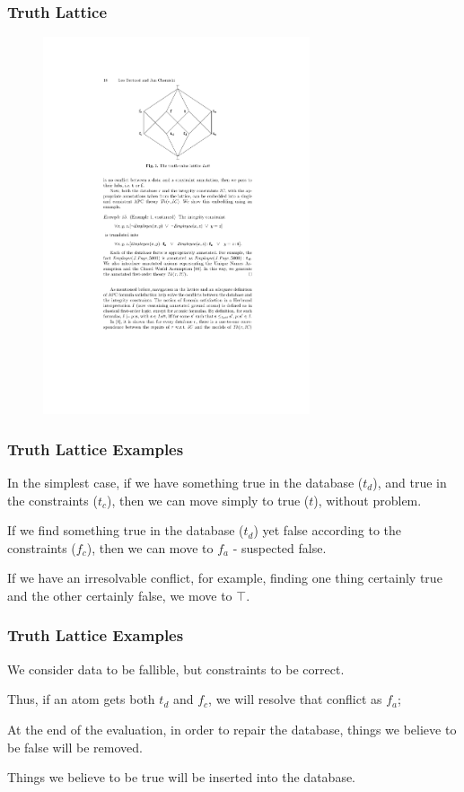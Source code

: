 \begin{frame}
\frametitle{Truth Lattice}

\begin{figure}[!h]
  \centering \includegraphics[width=0.7\textwidth]{images/TruthLattice.pdf}
\end{figure}


\end{frame}

\begin{frame}
\frametitle{Truth Lattice Examples}

In the simplest case, if we have something true in the database ($t_d$), and true in the constraints ($t_c$), then we can move simply to true ($t$), without problem. 

If we find something true in the database ($t_d$) yet false according to the constraints ($f_c$), then we can move to $f_a$ - suspected false. 

If we have an irresolvable conflict, for example, finding one thing certainly true and the other certainly false, we move to $\top$.

\end{frame}

\begin{frame}
\frametitle{Truth Lattice Examples}

We consider data to be fallible, but constraints to be correct.

Thus, if an atom gets both $t_d$ and $f_c$, we will resolve that conflict as $f_a$; 
 
 At the end of the evaluation, in order to repair the database, things we believe to 
be false will be removed.

Things we believe to be true will be inserted into the database.

\end{frame}

